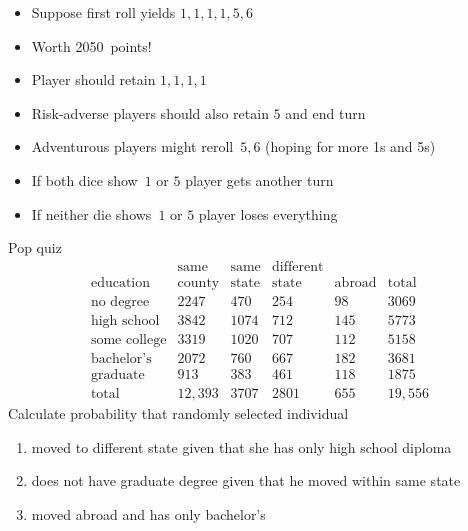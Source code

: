 \documentclass{beamer}
\theoremstyle{definition}
\begin{document}
\begin{frame}
\begin{example}
\begin{itemize}
\item Suppose first roll yields $1,1,1,1,5,6$
\item Worth 2050~points!
\item Player should retain $1,1,1,1$
\item Risk-adverse players should also retain $5$ and end turn
\item Adventurous players might reroll~$5,6$ (hoping
for more 1s and 5s)
\item If both dice show~$1$ or $5$ player gets another
turn
\item If neither die shows~$1$ or $5$ player loses everything
\end{itemize}
\end{example}

\end{frame}

\begin{frame}{Pop quiz}
\[\begin{array}{r|llll|l}
&\text{same}&\text{same}&\text{different}&&\\
\text{education}&\text{county}
&\text{state}&\text{state}&\text{abroad}&\text{total}\\\hline
\text{no degree}&2247&470&254&98&3069\\
\text{high school}&3842&1074&712&145&5773\\
\text{some college}&3319&1020&707&112&5158\\
\text{bachelor's}&2072&760&667&182&3681\\
\text{graduate}&913&383&461&118&1875\\\hline
\text{total}&12,393&3707&2801&655&19,556
\end{array}\]
Calculate probability that
randomly selected individual
\begin{enumerate}
\item moved to different state given that she
has only high school diploma
\item does \alert{not} have graduate degree given that he moved
within same state
\item moved abroad \alert{and} has only bachelor's
\end{enumerate}
\end{frame}
\end{document}
